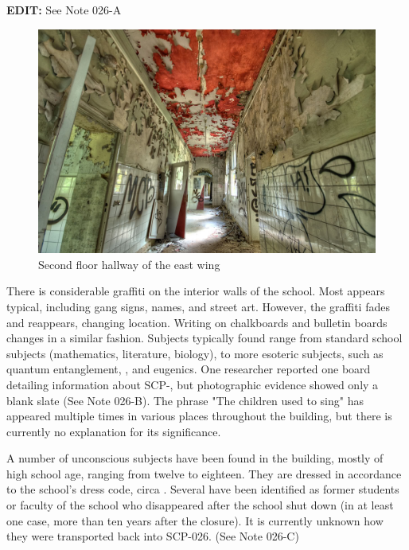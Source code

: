 \textbf{EDIT:} See Note 026-A

\begin{figure}[h]
\begin{center}
\includegraphics[scale=0.2]{scp/026b.jpg}
\linebreak Second floor hallway of the east wing
\end{center}
\end{figure}

There is considerable graffiti on the interior walls of the school. Most appears typical, including gang signs, names, and street art. However, the graffiti fades and reappears, changing location. Writing on chalkboards and bulletin boards changes in a similar fashion. Subjects typically found range from standard school subjects (mathematics, literature, biology), to more esoteric subjects, such as quantum entanglement, , and eugenics. One researcher reported one board detailing information about SCP-, but photographic evidence showed only a blank slate (See Note 026-B). The phrase "The children used to sing" has appeared multiple times in various places throughout the building, but there is currently no explanation for its significance.

A number of unconscious subjects have been found in the building, mostly of high school age, ranging from twelve to eighteen. They are dressed in accordance to the school's dress code, circa . Several have been identified as former students or faculty of the school who disappeared after the school shut down (in at least one case, more than ten years after the closure). It is currently unknown how they were transported back into SCP-026. (See Note 026-C)

